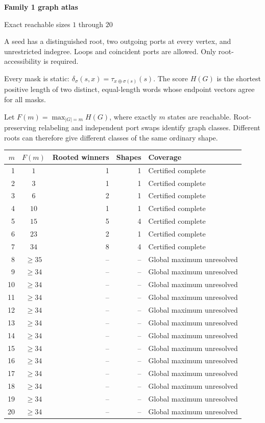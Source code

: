 \documentclass[10pt,a4paper]{article}
\begin{document}
{\LARGE\bfseries Family 1 graph atlas}\par\vspace{3mm}
{\large Exact reachable sizes $1$ through $20$}\par\vspace{5mm}
A seed has a distinguished root, two outgoing ports at every vertex, and unrestricted indegree. Loops and coincident ports are allowed. Only root-accessibility is required.\par\vspace{2mm}
Every mask is static: $\delta_\sigma(s,x)=\tau_{x\mathbin{\oplus}\sigma(s)}(s)$. The score $H(G)$ is the shortest positive length of two distinct, equal-length words whose endpoint vectors agree for all masks.\par\vspace{2mm}
Let $F(m)=\max_{|G|=m} H(G)$, where exactly $m$ states are reachable. Root-preserving relabeling and independent port swaps identify graph classes. Different roots can therefore give different classes of the same ordinary shape.\par\vspace{4mm}
\begin{center}\small\begin{tabular}{rcrrl}
\toprule $m$ & $F(m)$ & Rooted winners & Shapes & Coverage \\ \midrule
1 & $1$ & 1 & 1 & Certified complete \\
2 & $3$ & 1 & 1 & Certified complete \\
3 & $6$ & 2 & 1 & Certified complete \\
4 & $10$ & 1 & 1 & Certified complete \\
5 & $15$ & 5 & 4 & Certified complete \\
6 & $23$ & 2 & 1 & Certified complete \\
7 & $34$ & 8 & 4 & Certified complete \\
8 & $\ge 35$ & -- & -- & Global maximum unresolved \\
9 & $\ge 34$ & -- & -- & Global maximum unresolved \\
10 & $\ge 34$ & -- & -- & Global maximum unresolved \\
11 & $\ge 34$ & -- & -- & Global maximum unresolved \\
12 & $\ge 34$ & -- & -- & Global maximum unresolved \\
13 & $\ge 34$ & -- & -- & Global maximum unresolved \\
14 & $\ge 34$ & -- & -- & Global maximum unresolved \\
15 & $\ge 34$ & -- & -- & Global maximum unresolved \\
16 & $\ge 34$ & -- & -- & Global maximum unresolved \\
17 & $\ge 34$ & -- & -- & Global maximum unresolved \\
18 & $\ge 34$ & -- & -- & Global maximum unresolved \\
19 & $\ge 34$ & -- & -- & Global maximum unresolved \\
20 & $\ge 34$ & -- & -- & Global maximum unresolved \\
\bottomrule\end{tabular}\end{center}\vspace{2mm}
\end{document}
